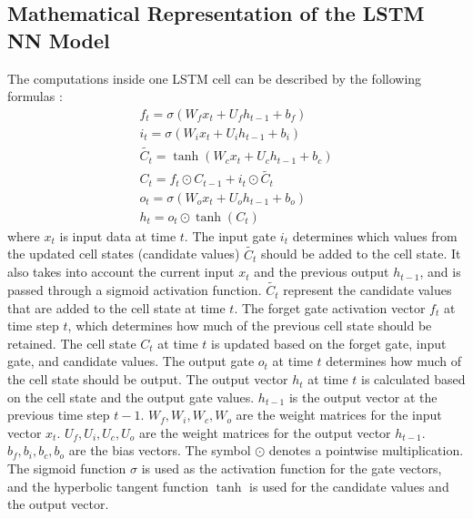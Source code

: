 \subsection{Mathematical Representation of the LSTM NN Model}
\label{bilstm_appendix}
The computations inside one LSTM cell can be described by the following formulas \citep{ihianle_2020}:
\begin{subequations}
    \begin{gather}
        f_t = \sigma(W_f x_t + U_f h_{t-1} + b_f)\\ 
        i_t = \sigma(W_i x_t + U_i h_{t-1} + b_i)\\ 
        \tilde{C_t} = \tanh(W_c x_t + U_c h_{t-1} + b_c)\\
        C_t = f_t \odot C_{t-1} + i_t \odot \tilde{C_t}\\
        o_t = \sigma(W_o x_t + U_o h_{t-1} + b_o)\\
        h_t = o_t \odot \tanh(C_t)
    \end{gather}
    \label{eq_lstm}
\end{subequations}
where $x_t$ is input data at time $t$. The input gate $i_t$ determines which values from the updated cell states (candidate values) $\tilde{C_t}$ should be added to the cell state. It also takes into account the current input $x_t$ and the previous output $h_{t-1}$, and is passed through a sigmoid activation function. 
$\tilde{C_t}$ represent the candidate values that are added to the cell state at time $t$. 
The forget gate activation vector $f_t$ at time step $t$, which determines how much of the previous cell state should be retained. 
The cell state $C_t$ at time $t$ is updated based on the forget gate, input gate, and candidate values. 
The output gate $o_t$ at time $t$ determines how much of the cell state should be output. 
The output vector $h_t$ at time $t$ is calculated based on the cell state and the output gate values.
$h_{t-1}$ is the output vector at the previous time step $t-1$. 
$W_f, W_i, W_c, W_o$ are the weight matrices for the input vector $x_t$. 
$U_f, U_i, U_c, U_o$ are the weight matrices for the output vector $h_{t-1}$.
$b_f, b_i, b_c, b_o$ are the bias vectors. 
The symbol $\odot$ denotes a pointwise multiplication. 
The sigmoid function $\sigma$ is used as the activation function for the gate vectors, and the hyperbolic tangent function $\tanh$ is used for the candidate values and the output vector.

